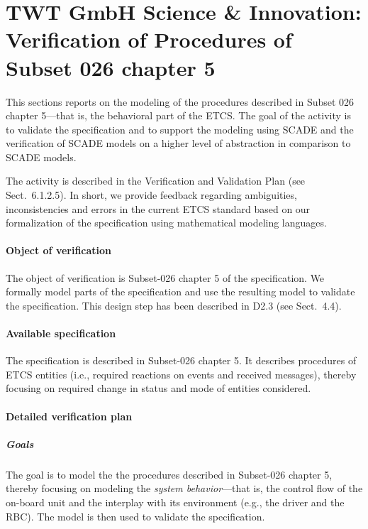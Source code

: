 \section{TWT GmbH Science \& Innovation: Verification of Procedures of Subset
026 chapter 5}
\label{sec:twt}
This sections reports on the modeling of the procedures described in Subset 026 chapter 5---that is, the behavioral part of the ETCS. The goal of the activity is to validate the specification and to support the modeling using SCADE and the verification of SCADE models on a higher level of abstraction in comparison to SCADE models.

The activity is described in the Verification and Validation Plan (see Sect.~6.1.2.5). In short, we provide feedback regarding ambiguities, inconsistencies and errors in the current ETCS standard based on our formalization of the specification using mathematical modeling languages.

\paragraph{Object of verification}

The object of verification is Subset-026 chapter 5 of the specification. We formally model parts of the specification and use the resulting model to validate the specification. This design step has been described in D2.3 (see Sect.~4.4).

\paragraph{Available specification}

The specification is described in Subset-026 chapter 5. It describes procedures of ETCS entities (i.e., required reactions on events and received messages), thereby focusing on required change in status and mode of entities considered.


\paragraph{Detailed verification plan}

\subparagraph{Goals} 

The goal is to model the the procedures described in Subset-026 chapter 5, thereby focusing on modeling the \textit{system behavior}---that is, the control flow of the on-board unit and the interplay with its environment (e.g., the driver and the RBC). The model is then used to validate the specification.

